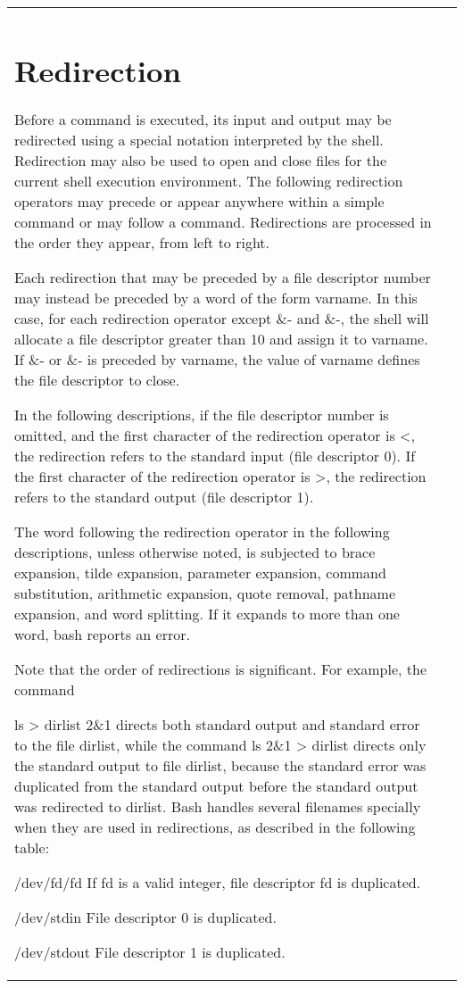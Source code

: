 \documentclass[11pt]{article}
\begin{document}
\begin{longtable}{p{}p{}}
{{{\section{Redirection}\label{sec:redirection}
Before a command is executed, its input and output may be redirected using a special notation interpreted by the shell. Redirection may also be used to open and close files for the current shell execution environment. The following redirection operators may precede or appear anywhere within a simple command or may follow a command. Redirections are processed in the order they appear, from left to right.

Each redirection that may be preceded by a file descriptor number may instead be preceded by a word of the form {varname}. In this case, for each redirection operator except \&- and \&-, the shell will allocate a file descriptor greater than 10 and assign it to varname. If \&- or \&- is preceded by {varname}, the value of varname defines the file descriptor to close.

In the following descriptions, if the file descriptor number is omitted, and the first character of the redirection operator is <, the redirection refers to the standard input (file descriptor 0). If the first character of the redirection operator is >, the redirection refers to the standard output (file descriptor 1).

The word following the redirection operator in the following descriptions, unless otherwise noted, is subjected to brace expansion, tilde expansion, parameter expansion, command substitution, arithmetic expansion, quote removal, pathname expansion, and word splitting. If it expands to more than one word, bash reports an error.

Note that the order of redirections is significant. For example, the command

ls > dirlist 2\&1
directs both standard output and standard error to the file dirlist, while the command
ls 2\&1 > dirlist
directs only the standard output to file dirlist, because the standard error was duplicated from the standard output before the standard output was redirected to dirlist.
Bash handles several filenames specially when they are used in redirections, as described in the following table:

/dev/fd/fd
If fd is a valid integer, file descriptor fd is duplicated.

/dev/stdin
File descriptor 0 is duplicated.

/dev/stdout
File descriptor 1 is duplicated.

}}}
\end{longtable}
\end{document}
